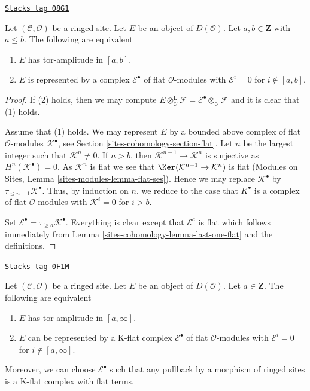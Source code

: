 \begin{lemma}
\label{sites-cohomology-lemma-tor-amplitude}
\href{https://stacks.math.columbia.edu/tag/08G1}{\texttt{Stacks tag 08G1}}

Let $(\mathcal{C}, \mathcal{O})$ be a ringed site. Let $E$ be an object of
$D(\mathcal{O})$. Let $a, b \in \mathbf{Z}$ with $a \leq b$. The following
are equivalent
\begin{enumerate}
\item $E$ has tor-amplitude in $[a, b]$.
\item $E$ is represented by a complex
$\mathcal{E}^\bullet$ of flat $\mathcal{O}$-modules with
$\mathcal{E}^i = 0$ for $i \not \in [a, b]$.
\end{enumerate}
\end{lemma}

\begin{proof}
If (2) holds, then we may compute
$E \otimes_\mathcal{O}^\mathbf{L} \mathcal{F} =
\mathcal{E}^\bullet \otimes_\mathcal{O} \mathcal{F}$
and it is clear that (1) holds.

\medskip\noindent
Assume that (1) holds. We may represent $E$ by a bounded above complex
of flat $\mathcal{O}$-modules $\mathcal{K}^\bullet$, see
Section \ref{sites-cohomology-section-flat}.
Let $n$ be the largest integer such that $\mathcal{K}^n \not = 0$.
If $n > b$, then $\mathcal{K}^{n - 1} \to \mathcal{K}^n$ is surjective as
$H^n(\mathcal{K}^\bullet) = 0$. As $\mathcal{K}^n$ is flat we see that
$\Ker(\mathcal{K}^{n - 1} \to \mathcal{K}^n)$ is flat
(Modules on Sites, Lemma \ref{sites-modules-lemma-flat-ses}).
Hence we may replace $\mathcal{K}^\bullet$ by
$\tau_{\leq n - 1}\mathcal{K}^\bullet$. Thus, by induction on $n$, we
reduce to the case that $K^\bullet$ is a complex of flat
$\mathcal{O}$-modules with $\mathcal{K}^i = 0$ for $i > b$.

\medskip\noindent
Set $\mathcal{E}^\bullet = \tau_{\geq a}\mathcal{K}^\bullet$.
Everything is clear except that $\mathcal{E}^a$ is flat
which follows immediately from Lemma \ref{sites-cohomology-lemma-last-one-flat}
and the definitions.
\end{proof}

\begin{lemma}
\label{sites-cohomology-lemma-bounded-below-tor-amplitude}
\href{https://stacks.math.columbia.edu/tag/0F1M}{\texttt{Stacks tag 0F1M}}

Let $(\mathcal{C}, \mathcal{O})$ be a ringed site. Let $E$ be an object of
$D(\mathcal{O})$. Let $a \in \mathbf{Z}$. The following
are equivalent
\begin{enumerate}
\item $E$ has tor-amplitude in $[a, \infty]$.
\item $E$ can be represented by a K-flat complex $\mathcal{E}^\bullet$
of flat $\mathcal{O}$-modules with $\mathcal{E}^i = 0$ for
$i \not \in [a, \infty]$.
\end{enumerate}
Moreover, we can choose $\mathcal{E}^\bullet$ such that any pullback
by a morphism of ringed sites is a K-flat complex with flat terms.
\end{lemma}

